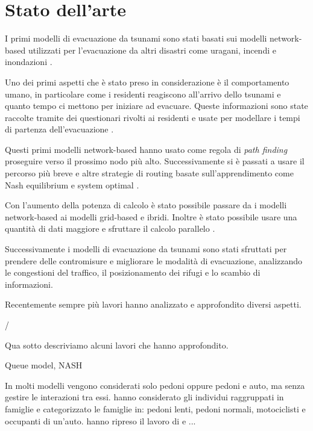 \section{Stato dell'arte}
\label{sec:stato-arte}
I primi modelli di evacuazione da tsunami sono stati basati sui modelli network-based utilizzati per l'evacuazione da altri disastri come
uragani, incendi e inondazioni \parencite{usuzawa1997development, imamura2001development}.

Uno dei primi aspetti che è stato preso in considerazione è il comportamento umano,
in particolare come i residenti reagiscono all'arrivo dello tsunami
e quanto tempo ci mettono per iniziare ad evacuare.
%
Queste informazioni sono state raccolte tramite dei questionari rivolti ai residenti
e usate per modellare i tempi di partenza dell'evacuazione \parencite{imamura2001development, saito2004simulation}.

Questi primi modelli network-based hanno usato come regola di \textit{path finding}
proseguire verso il prossimo nodo più alto. Successivamente si è passati a usare il percorso
più breve \parencite{katada2004disaster} e altre strategie di routing basate sull'apprendimento come Nash equilibrium e system optimal \parencite{lammel2009towards}.

\vspace*{4mm}
Con l'aumento della potenza di calcolo è stato possibile passare da i modelli network-based ai modelli grid-based e ibridi.
Inoltre è stato possibile usare una quantità di dati maggiore e sfruttare il calcolo parallelo \parencite{wijerathne2013hpc, makinoshima2018enhancing}.

\vspace*{4mm}
Successivamente i modelli di evacuazione da tsunami sono stati sfruttati per prendere delle contromisure e migliorare le modalità di evacuazione,
analizzando le congestioni del traffico, il posizionamento dei rifugi e lo scambio di informazioni.


\newpage
\noindent
Recentemente sempre più lavori hanno analizzato e approfondito diversi aspetti.

/

\noindent
Qua sotto descriviamo alcuni lavori che hanno approfondito.

\vspace*{4mm}
\textbf{\textcite{lammel2010emergency}} Queue model, NASH

In molti modelli vengono considerati solo pedoni oppure pedoni e auto, ma senza gestire le interazioni tra essi.
\textcite{goto2012tsunami} hanno considerato gli individui raggruppati in famiglie e categorizzato le famiglie in:
pedoni lenti, pedoni normali, motociclisti e occupanti di un'auto.
\textcite{wang2021novel} hanno ripreso il lavoro di \textcite{goto2012tsunami} e ...

